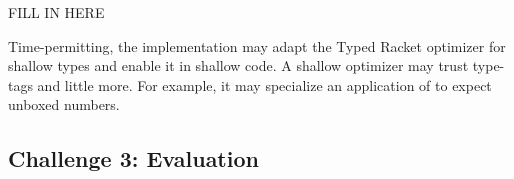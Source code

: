 FILL IN HERE

Time-permitting, the implementation may adapt the Typed Racket optimizer for shallow types and enable it in shallow code.
A shallow optimizer may trust type-tags and little more.
For example, it may specialize an application of \racketcode{+} to expect unboxed numbers.


\subsection{Challenge 3: Evaluation}


